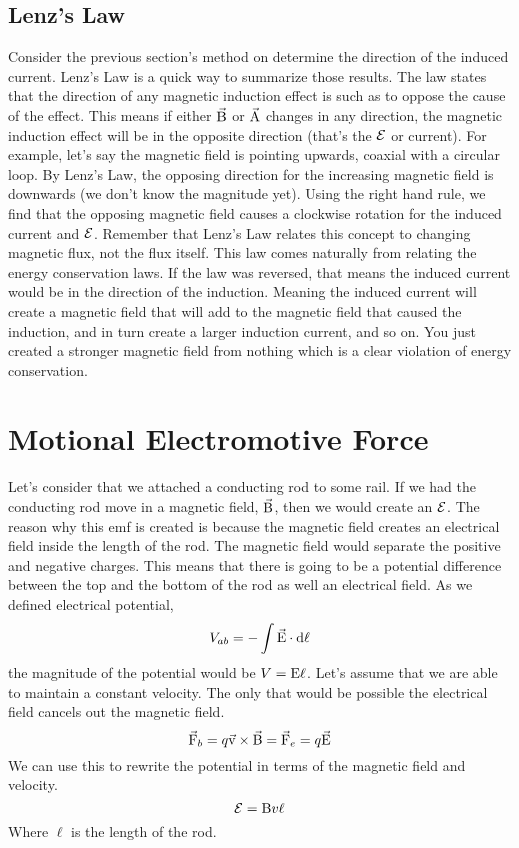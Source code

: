\subsection{Lenz's Law}
Consider the previous section's method on determine the direction of the induced current. Lenz's Law is a quick way to summarize those results. The law states that the direction of any magnetic induction effect is such as to oppose the cause of the effect. This means if either $\vec{\mathrm{B}}$ or $\vec{\mathrm{A}}$ changes in any direction, the magnetic induction effect will be in the opposite direction (that's the $\mathcal{E}$ or current). For example, let's say the magnetic field is pointing upwards, coaxial with a circular loop. By Lenz's Law, the opposing direction for the increasing magnetic field is downwards (we don't know the magnitude yet). Using the right hand rule, we find that the opposing magnetic field causes a clockwise rotation for the induced current and $\mathcal{E}$. Remember that Lenz's Law relates this concept to changing magnetic flux, not the flux itself. This law comes naturally from relating the energy conservation laws. If the law was reversed, that means the induced current would be in the direction of the induction. Meaning the induced current will create a magnetic field that will add to the magnetic field that caused the induction, and in turn create a larger induction current, and so on. You just created a stronger magnetic field from nothing which is a clear violation of energy conservation. 
\section{Motional Electromotive Force}
Let's consider that we attached a conducting rod to some rail. If we had the conducting rod move in a magnetic field, $\vec{\mathrm{B}}$, then we would create an $\mathcal{E}$. The reason why this emf is created is because the magnetic field creates an electrical field inside the length of the rod. The magnetic field would separate the positive and negative charges. This means that there is going to be a potential difference between the top and the bottom of the rod as well an electrical field. As we defined electrical potential,
\begin{equation*}
	V_{ab} = -\int \vec{\mathrm{E}} \cdot \mathrm{d}\ell
\end{equation*}
the magnitude of the potential would be $V=\mathrm{E}\ell$. Let's assume that we are able to maintain a constant velocity. The only that would be possible the electrical field cancels out the magnetic field. 
\begin{equation*}
	\vec{\mathrm{F}}_b = q\vec{\mathrm{v}} \times \vec{\mathrm{B}} = \vec{\mathrm{F}}_e = q\vec{\mathrm{E}} 
\end{equation*}
We can use this to rewrite the potential in terms of the magnetic field and velocity.
\begin{equation*}
	\mathcal{E} = \mathrm{B}v\ell 
\end{equation*}
Where $\ell$ is the length of the rod. 
